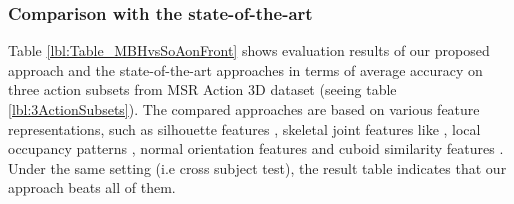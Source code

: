 \documentclass[final,3p,times,twocolumn]{elsarticle}
\begin{document}
\subsubsection{Comparison with the state-of-the-art}
Table \ref{lbl:Table_MBHvsSoAonFront} shows evaluation results of our proposed approach and the state-of-the-art approaches in terms of average accuracy on three action subsets from MSR Action 3D dataset (seeing table \ref{lbl:3ActionSubsets}).
The compared approaches are based on various feature representations, such as silhouette features \cite{li2010action, yang2012recognizing}, skeletal joint features like \cite{yang2012eigenjoints, wang2012mining}, local occupancy patterns \cite{wang2012robust, vieira2012stop}, normal orientation features \cite{oreifej2013hon4d} and cuboid similarity features \cite{xia2013spatio}.
Under the same setting (i.e cross subject test), the result table indicates that our approach beats all of them.
\end{document}
